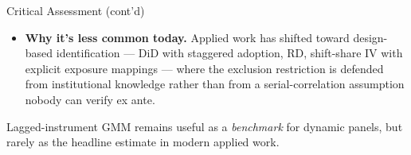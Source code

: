\documentclass[aspectratio=169, handout, t]{beamer}
\numberwithin{equation}{section}
\begin{document}
\begin{frame}{Critical Assessment (cont'd)}
\begin{itemize}
\item \textbf{Why it's less common today.}  Applied work has shifted toward design-based identification --- DiD with staggered adoption, RD, shift-share IV with explicit exposure mappings --- where the exclusion restriction is defended from institutional knowledge rather than from a serial-correlation assumption nobody can verify ex ante.
\end{itemize}
\begin{tcolorbox}[colback=blue!5, colframe=blue!50]
Lagged-instrument GMM remains useful as a \emph{benchmark} for dynamic panels, but rarely as the headline estimate in modern applied work.
\end{tcolorbox}
\end{frame}
\end{document}
